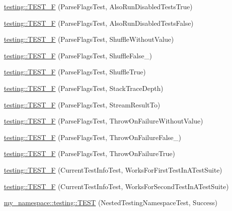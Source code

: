 \begin{DoxyCompactItemize}
\item 
\mbox{\hyperlink{namespacetesting_accb8f0a859dab6088b9429bf6fb3e1ac}{testing\+::\+T\+E\+S\+T\+\_\+F}} (Parse\+Flags\+Test, Also\+Run\+Disabled\+Tests\+True)
\item 
\mbox{\hyperlink{namespacetesting_afde27ba975e4a485af64de4c37dcbb98}{testing\+::\+T\+E\+S\+T\+\_\+F}} (Parse\+Flags\+Test, Also\+Run\+Disabled\+Tests\+False)
\item 
\mbox{\hyperlink{namespacetesting_a23373676b5605f4446444568b03851c1}{testing\+::\+T\+E\+S\+T\+\_\+F}} (Parse\+Flags\+Test, Shuffle\+Without\+Value)
\item 
\mbox{\hyperlink{namespacetesting_ac510159c0bac8ecf77e0d3884569b314}{testing\+::\+T\+E\+S\+T\+\_\+F}} (Parse\+Flags\+Test, Shuffle\+False\+\_)
\item 
\mbox{\hyperlink{namespacetesting_a11ba77d82075e6b72cc2cc3a0568eb4b}{testing\+::\+T\+E\+S\+T\+\_\+F}} (Parse\+Flags\+Test, Shuffle\+True)
\item 
\mbox{\hyperlink{namespacetesting_a1061c3a0db32c0706e9beba39c4d4324}{testing\+::\+T\+E\+S\+T\+\_\+F}} (Parse\+Flags\+Test, Stack\+Trace\+Depth)
\item 
\mbox{\hyperlink{namespacetesting_aa4c92d2a72b78b58c0bf7f59fc2be6d6}{testing\+::\+T\+E\+S\+T\+\_\+F}} (Parse\+Flags\+Test, Stream\+Result\+To)
\item 
\mbox{\hyperlink{namespacetesting_a1b96e71b9d6bde57bb5f7536961b5076}{testing\+::\+T\+E\+S\+T\+\_\+F}} (Parse\+Flags\+Test, Throw\+On\+Failure\+Without\+Value)
\item 
\mbox{\hyperlink{namespacetesting_a1b5b5c2e1f15ff13cad4ac7d5415f271}{testing\+::\+T\+E\+S\+T\+\_\+F}} (Parse\+Flags\+Test, Throw\+On\+Failure\+False\+\_)
\item 
\mbox{\hyperlink{namespacetesting_a439e3e79125f5222ddd95b8036252061}{testing\+::\+T\+E\+S\+T\+\_\+F}} (Parse\+Flags\+Test, Throw\+On\+Failure\+True)
\item 
\mbox{\hyperlink{namespacetesting_aa98ab448e05f39e83f5d40c1597cf6f1}{testing\+::\+T\+E\+S\+T\+\_\+F}} (Current\+Test\+Info\+Test, Works\+For\+First\+Test\+In\+A\+Test\+Suite)
\item 
\mbox{\hyperlink{namespacetesting_accb82db6202dbbc79a9597ea5d5ff234}{testing\+::\+T\+E\+S\+T\+\_\+F}} (Current\+Test\+Info\+Test, Works\+For\+Second\+Test\+In\+A\+Test\+Suite)
\item 
\mbox{\hyperlink{namespacemy__namespace_1_1testing_ad673a1b79baca8e8c493774b2a4b0127}{my\+\_\+namespace\+::testing\+::\+T\+E\+ST}} (Nested\+Testing\+Namespace\+Test, Success)

\end{DoxyCompactItemize}
